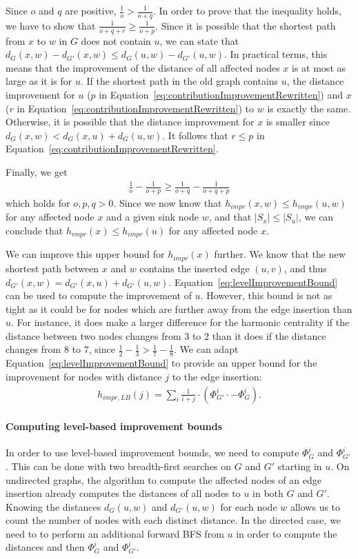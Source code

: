 Since $o$ and $q$ are positive, $\frac{1}{o} > \frac{1}{o + q}$. In order to prove that the inequality holds, we have to show that $\frac{1}{o + q + r} \geq \frac{1}{o + p}$. Since it is possible that the shortest path from $x$ to $w$ in $G$ does not contain $u$, we can state that $d_G(x, w) - d_{G'}(x, w) \leq d_G(u, w) - d_{G'}(u, w)$. In practical terms, this means that the improvement of the distance of all affected nodes $x$ is at most as large as it is for $u$. If the shortest path in the old graph contains $u$, the distance improvement for $u$ ($p$ in Equation~\ref{eq:contributionImprovementRewritten}) and $x$ ($r$ in Equation~\ref{eq:contributionImprovementRewritten}) to $w$ is exactly the same. Otherwise, it is possible that the distance improvement for $x$ is smaller since $d_G(x, w) < d_G(x, u) + d_G(u, w)$. It follows that $r \leq p$ in Equation~\ref{eq:contributionImprovementRewritten}. 

Finally, we get
 \begin{align}
	\frac{1}{o} - \frac{1}{o + p} \geq \frac{1}{o + q} - \frac{1}{o + q + p}
\end{align}
which holds for $o, p, q > 0$. Since we now know that $h_{impr}(x, w) \leq h_{impr}(u, w)$ for any affected node $x$ and a given sink node $w$, and that $|S_x| \leq |S_u|$, we can conclude that $h_{impr}(x) \leq h_{impr}(u)$ for any affected node $x$. 

We can improve this upper bound for $h_{impr}(x)$ further. We know that the new shortest path between $x$ and $w$ contains the inserted edge $(u, v)$, and thus $d_{G'}(x, w) = d_{G'}(x, u) + d_{G'}(u, w)$. Equation~\ref{eq:levelImprovementBound} can be used to compute the improvement of $u$. However, this bound is not as tight as it could be for nodes which are further away from the edge insertion than $u$. For instance, it does make a larger difference for the harmonic centrality if the distance between two nodes changes from $3$ to $2$ than it does if the distance changes from $8$ to $7$, since $\frac{1}{2} - \frac{1}{3} > \frac{1}{7} - \frac{1}{8}$. We can adapt Equation~\ref{eq:levelImprovementBound} to provide an upper bound for the improvement for nodes with distance $j$ to the edge insertion:
\begin{align}
	h_{impr,LB}(j) = \sum_{i}{\frac{1}{i + j} \cdot \left(\Phi_{G'}^i \cdot - \Phi_G^i\right)}.
\end{align}


\paragraph{Computing level-based improvement bounds}
In order to use level-based improvement bounds, we need to compute $\Phi_G^i$ and $\Phi_{G'}^i$. This can be done with two breadth-first searches on $G$ and $G'$ starting in $u$. On undirected graphs, the algorithm to compute the affected nodes of an edge insertion already computes the distances of all nodes to $u$ in both $G$ and $G'$. Knowing the distances $d_G(u, w)$ and $d_{G'}(u, w)$ for each node $w$ allows us to count the number of nodes with each distinct distance. In the directed case, we need to to perform an additional forward BFS from $u$ in order to compute the distances and then $\Phi_G^i$ and $\Phi_{G'}^i$.

